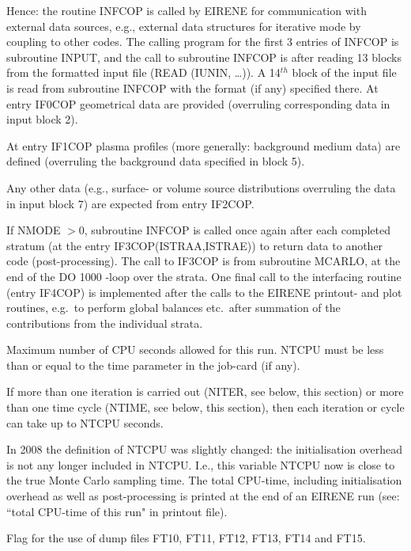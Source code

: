 \begin{description}
\begin{description}
                Hence: the routine INFCOP is called by EIRENE for communication with external
                data sources, e.g., external data structures for iterative mode by coupling to
                other codes.
                The calling program for the first 3 entries of INFCOP is subroutine INPUT, and
                the call to subroutine INFCOP is after reading 13 blocks from the formatted
                input file (READ (IUNIN, \dots)).
                A 14$^{th}$ block of the input file is read from subroutine INFCOP with the
                format (if any) specified there.
                At entry IF0COP geometrical data are provided (overruling corresponding data in
                input block 2).

                At entry IF1COP plasma profiles (more generally: background medium data) are
                defined (overruling the background data specified in block 5).

                Any other data (e.g., surface- or volume source distributions overruling the
                data in input block 7) are expected from entry IF2COP.

          \item[$> 0$] If NMODE $> 0$, subroutine INFCOP is called once again after each
                completed stratum (at the entry IF3COP(ISTRAA,ISTRAE)) to return data to
                another code (post-processing).
                The call to IF3COP is from subroutine MCARLO, at the end of the DO 1000 -loop
                over the strata.
                One final call to the interfacing routine (entry IF4COP) is implemented after
                the calls to the EIRENE printout- and plot routines, e.g.\ to perform global
                balances etc.\ after summation of the contributions from the individual strata.

        \end{description}
  \item[NTCPU] Maximum number of CPU seconds allowed for this run.
        NTCPU must be less than or equal to the time parameter in the job-card (if
        any).

        If more than one iteration is carried out (NITER, see below, this section) or
        more than one time cycle (NTIME, see below, this section), then each iteration
        or cycle can take up to NTCPU seconds.

        In 2008 the definition of NTCPU was slightly changed:
        the initialisation overhead is not any longer included in NTCPU.
        I.e., this variable NTCPU now is close to the true Monte Carlo sampling time.
        The total CPU-time, including initialisation overhead as well as
        post-processing is printed at the end of an EIRENE run (see: ``total CPU-time
        of this run" in printout file).
  \item[NFILE] Flag for the use of dump files FT10, FT11, FT12, FT13, FT14 and
        FT15.


\end{description}

